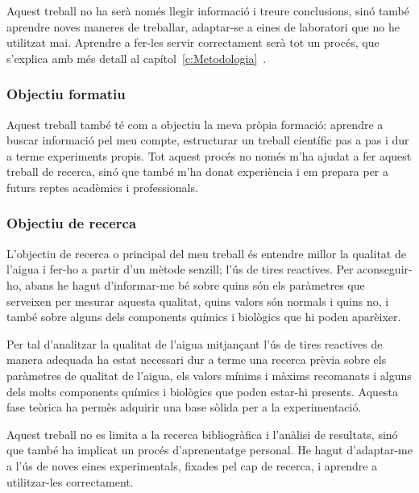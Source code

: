 Aquest treball no ha serà només llegir informació i treure conclusions, sinó també aprendre noves maneres de treballar, adaptar-se a eines de laboratori que no he utilitzat mai. Aprendre a fer-les servir correctament serà tot un procés, que s'explica amb més detall al capítol~\ref{c:Metodologia}~.

\subsubsection{Objectiu formatiu}
Aquest treball també té com a objectiu la meva pròpia formació: aprendre a buscar informació pel meu compte, estructurar un treball científic pas a pas i dur a terme experiments propis. Tot aquest procés no només m’ha ajudat a fer aquest treball de recerca, sinó que també m’ha donat experiència i em prepara per a futurs reptes acadèmics i professionals.

\subsubsection{Objectiu de recerca}
L’objectiu de recerca o principal del meu treball és entendre millor la qualitat de l’aigua i fer-ho a partir d’un mètode senzill; l’ús de tires reactives. Per aconseguir-ho, abans he hagut d’informar-me bé sobre quins són els paràmetres que serveixen per mesurar aquesta qualitat, quins valors són normals i quins no, i també sobre alguns dels components químics i biològics que hi poden aparèixer.





Per tal d'analitzar la qualitat de l’aigua mitjançant l’ús de tires reactives  de manera adequada ha estat necessari dur a terme una recerca prèvia sobre els paràmetres de qualitat de l’aigua, els valors mínims i màxims recomanats i alguns dels molts components químics i biològics que poden estar-hi presents. Aquesta fase teòrica ha permès adquirir una base sòlida per a la experimentació.

Aquest treball no es limita a la recerca bibliogràfica i l’anàlisi de resultats, sinó que també ha implicat un procés d’aprenentatge personal. He hagut d’adaptar-me a l’ús de noves eines experimentals, fixades pel cap de recerca, i aprendre a utilitzar-les correctament.

